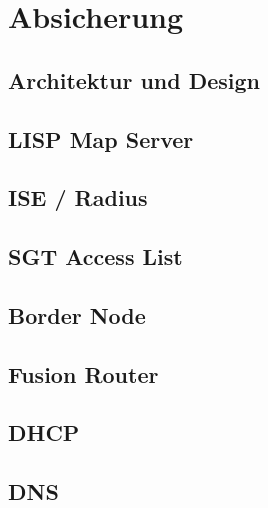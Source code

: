 \section{Absicherung}

\subsection{Architektur und Design}

\subsection{LISP Map Server}

\subsection{ISE / Radius}

\subsection{SGT Access List}

\subsection{Border Node}

\subsection{Fusion Router}

\subsection{DHCP}

\subsection{DNS}

